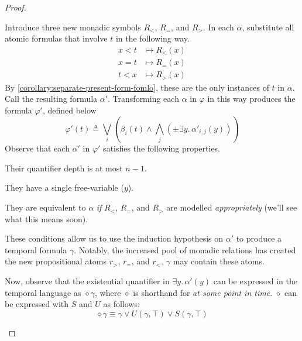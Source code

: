 \documentclass[a4paper,UKenglish,cleveref, autoref, thm-restate, numberwithinsect]{lipics-v2021}
\begin{document}
\begin{proof}
\begin{description}
        Introduce three new monadic symbols $R_<$, $R_=$, and $R_>$. In each $\alpha$, substitute all atomic formulas that involve $t$ in the following way.
        \begin{equation*}
            \begin{aligned}
                x < t &\longmapsto R_<(x)\\
                x = t &\longmapsto R_=(x)\\
                t < x  &\longmapsto R_>(x)
            \end{aligned}
        \end{equation*}
        By \cref{corollary:separate-present-form-fomlo}, these are the only instances of $t$ in $\alpha$. Call the resulting formula $\alpha'$. Transforming each $\alpha$ in $\varphi$ in this way produces the formula $\varphi'$, defined below
        \begin{equation}
            \label{eq:present-separate-form-fomlo-without-t}
            \varphi'(t) \triangleq \bigvee_i \left( \beta_i(t) \land \bigwedge_j \left( \pm \exists y.\, \alpha'_{i, j}\left(y\right) \right) \right)
        \end{equation}
        Observe that each $\alpha'$ in $\varphi'$ satisfies the following properties.
        \begin{alphaenumerate}
            \item Their quantifier depth is at most $n - 1$.
            \item They have a single free-variable ($y$).
            \item They are equivalent to $\alpha$ \textit{if} $R_<$, $R_=$, and $R_>$ are modelled \textit{appropriately} (we'll see what this means soon).
        \end{alphaenumerate}
        These conditions allow us to use the induction hypothesis on $\alpha'$ to produce a temporal formula $\gamma$. Notably, the increased pool of monadic relations has created the new propositional atoms $r_>$, $r_=$, and $r_<$. $\gamma$ may contain these atoms.

        Now, observe that the existential quantifier in $\exists y.\, \alpha'(y)$ can be expressed in the temporal language as $\diamond \gamma$, where $\diamond$ is shorthand for \textit{at some point in time}. $\diamond$ can be expressed with $S$ and $U$ as follows:
        \begin{equation*}
            \diamond \gamma \equiv \gamma \lor U(\gamma,\top) \lor S(\gamma, \top)
        \end{equation*}


\end{description}
\end{proof}
\end{document}
